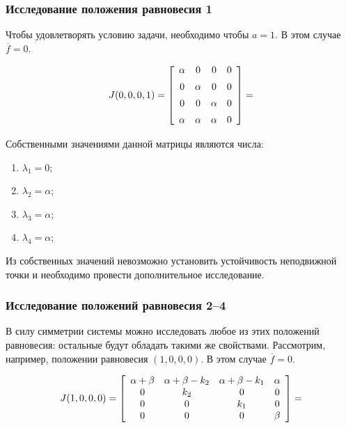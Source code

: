 \documentclass[12pt]{article}
\theoremstyle{rusdef}
\begin{document}
	\subsubsection{Исследование положения равновесия 1}
	
	Чтобы удовлетворять условию задачи, необходимо чтобы $a = 1$. В этом случае $\overline{f} = 0$.
	
	\begin{gather}
	J(0, 0, 0, 1) = \left[
	\begin{array}{cccc}
	\alpha & 0 & 0 & 0 \\[0.5em]
	0 & \alpha & 0 & 0 \\[0.5em]
	0 & 0 & \alpha & 0 \\[0.5em]
	\alpha & \alpha & \alpha & 0
	\end{array}
	\right] = \notag
	\end{gather}

	Собственными значениями данной матрицы являются числа:
	\begin{enumerate}
		\item
		$\lambda_1 = 0$;
		\item
		$\lambda_2 = \alpha$;
		\item
		$\lambda_3 = \alpha$;
		\item
		$\lambda_4 = \alpha$;
	\end{enumerate}
	
	Из собственных значений невозможно установить устойчивость неподвижной точки и необходимо провести дополнительное исследование.

	\subsubsection{Исследование положений равновесия 2--4}
	
	В силу симметрии системы можно исследовать любое из этих положений равновесия: остальные будут обладать такими же свойствами. Рассмотрим, например, положении равновесия $(1, 0, 0, 0)$. В этом случае $\overline{f} = 0$.
	
	\begin{gather}
	J(1, 0, 0, 0) = \left[
\begin{array}{cccc} \alpha + \beta & \alpha + \beta - k_2 & \alpha + \beta - k_1 & \alpha\\ 0 & k_2 & 0 & 0\\ 0 & 0 & k_1 & 0\\ 0 & 0 & 0 & \beta \end{array}	%
	\right] = \notag
	\end{gather}
	
\end{document}
